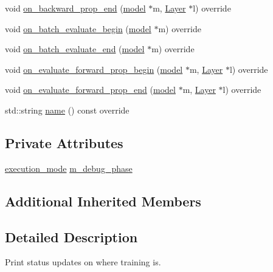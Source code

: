 \begin{DoxyCompactItemize}
\item 
void \hyperlink{classlbann_1_1lbann__callback__debug_a19a8ec63f55fc86024c9ab8fe0836500}{on\+\_\+backward\+\_\+prop\+\_\+end} (\hyperlink{classlbann_1_1model}{model} $\ast$m, \hyperlink{classlbann_1_1Layer}{Layer} $\ast$l) override
\item 
void \hyperlink{classlbann_1_1lbann__callback__debug_ac364fb6e77dc163e146af77bb670d74b}{on\+\_\+batch\+\_\+evaluate\+\_\+begin} (\hyperlink{classlbann_1_1model}{model} $\ast$m) override
\item 
void \hyperlink{classlbann_1_1lbann__callback__debug_a07a02eb525ebe9c06b361c48fc2977c8}{on\+\_\+batch\+\_\+evaluate\+\_\+end} (\hyperlink{classlbann_1_1model}{model} $\ast$m) override
\item 
void \hyperlink{classlbann_1_1lbann__callback__debug_a83fe16882119a54afe59ba616fe1722a}{on\+\_\+evaluate\+\_\+forward\+\_\+prop\+\_\+begin} (\hyperlink{classlbann_1_1model}{model} $\ast$m, \hyperlink{classlbann_1_1Layer}{Layer} $\ast$l) override
\item 
void \hyperlink{classlbann_1_1lbann__callback__debug_a19639823e288e7599947c0abfaa6d1f4}{on\+\_\+evaluate\+\_\+forward\+\_\+prop\+\_\+end} (\hyperlink{classlbann_1_1model}{model} $\ast$m, \hyperlink{classlbann_1_1Layer}{Layer} $\ast$l) override
\item 
std\+::string \hyperlink{classlbann_1_1lbann__callback__debug_ae9e892671f4959cfc915e1662afd6d60}{name} () const override
\end{DoxyCompactItemize}
\subsection*{Private Attributes}
\begin{DoxyCompactItemize}
\item 
\hyperlink{base_8hpp_a2781a159088df64ed7d47cc91c4dc0a8}{execution\+\_\+mode} \hyperlink{classlbann_1_1lbann__callback__debug_acc66ab699534e42aa958148f1fb3fd6f}{m\+\_\+debug\+\_\+phase}
\end{DoxyCompactItemize}
\subsection*{Additional Inherited Members}


\subsection{Detailed Description}
Print status updates on where training is. 

